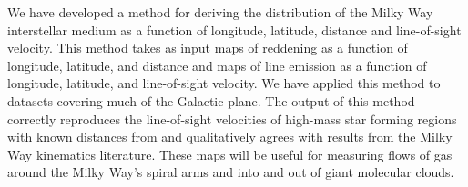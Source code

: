 
We have developed a method for deriving the distribution of the Milky Way interstellar medium as a function of longitude, latitude, distance and line-of-sight velocity.
This method takes as input maps of reddening as a function of longitude, latitude, and distance and maps of line emission as a function of longitude, latitude, and line-of-sight velocity.
We have applied this method to datasets covering much of the Galactic plane.
The output of this method correctly reproduces the line-of-sight velocities of high-mass star forming regions with known distances from \citet{Reid:2014km} and qualitatively agrees with results from the Milky Way kinematics literature. 
These maps will be useful for measuring flows of gas around the Milky Way's spiral arms and into and out of giant molecular clouds.
